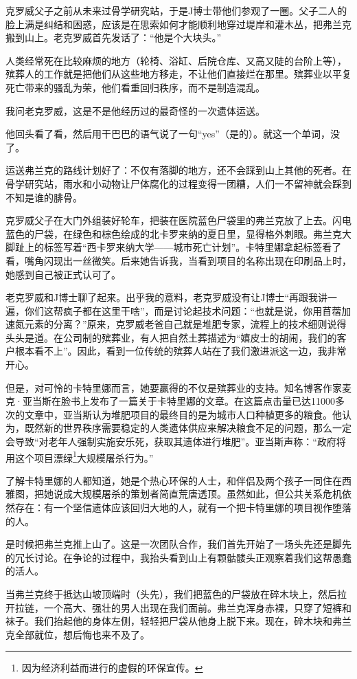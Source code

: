 \documentclass[12pt,oneside]{book}
\begin{document}
克罗威父子之前从未来过骨学研究站，于是J博士带他们参观了一圈。父子二人的脸上满是纠结和困惑，应该是在思索如何才能顺利地穿过堤岸和灌木丛，把弗兰克搬到山上。老克罗威首先发话了：“他是个大块头。”

人类经常死在比较麻烦的地方（轮椅、浴缸、后院仓库、又高又陡的台阶上等），殡葬人的工作就是把他们从这些地方移走，不让他们直接烂在那里。殡葬业以平复死亡带来的骚乱为荣，他们看重回归秩序，而不是制造混乱。

我问老克罗威，这是不是他经历过的最奇怪的一次遗体运送。

他回头看了看，然后用干巴巴的语气说了一句“yes”（是的）。就这一个单词，没了。

运送弗兰克的路线计划好了：不仅有落脚的地方，还不会踩到山上其他的死者。在骨学研究站，雨水和小动物让尸体腐化的过程变得一团糟，人们一不留神就会踩到不知是谁的腓骨。

克罗威父子在大门外组装好轮车，把装在医院蓝色尸袋里的弗兰克放了上去。闪电蓝色的尸袋，在绿色和棕色绘成的北卡罗来纳的夏日里，显得格外刺眼。弗兰克大脚趾上的标签写着“西卡罗来纳大学——城市死亡计划”。卡特里娜拿起标签看了看，嘴角闪现出一丝微笑。后来她告诉我，当看到项目的名称出现在印刷品上时，她感到自己被正式认可了。

老克罗威和J博士聊了起来。出乎我的意料，老克罗威没有让J博士“再跟我讲一遍，你们这帮疯子都在这里干啥”，而是讨论起技术问题：“也就是说，你用苜蓿加速氮元素的分离？”原来，克罗威老爸自己就是堆肥专家，流程上的技术细则说得头头是道。在公司制的殡葬业，有人把自然土葬描述为“嬉皮士的胡闹，我们的客户根本看不上”。因此，看到一位传统的殡葬人站在了我们激进派这一边，我非常开心。

但是，对可怜的卡特里娜而言，她要赢得的不仅是殡葬业的支持。知名博客作家麦克·亚当斯在脸书上发布了一篇关于卡特里娜的文章。在这篇点击量已达11000多次的文章中，亚当斯认为堆肥项目的最终目的是为城市人口种植更多的粮食。他认为，既然新的世界秩序需要稳定的人类遗体供应来解决粮食不足的问题，那么一定会导致“对老年人强制实施安乐死，获取其遗体进行堆肥”。亚当斯声称：“政府将用这个项目漂绿\footnote{因为经济利益而进行的虚假的环保宣传。}大规模屠杀行为。”

了解卡特里娜的人都知道，她是个热心环保的人士，和伴侣及两个孩子一同住在西雅图，把她说成大规模屠杀的策划者简直荒唐透顶。虽然如此，但公共关系危机依然存在：有一个坚信遗体应该回归大地的人，就有一个把卡特里娜的项目视作堕落的人。

是时候把弗兰克推上山了。这是一次团队合作，我们首先开始了一场头先还是脚先的冗长讨论。在争论的过程中，我抬头看到山上有颗骷髅头正观察着我们这帮愚蠢的活人。

当弗兰克终于抵达山坡顶端时（头先），我们把蓝色的尸袋放在碎木块上，然后拉开拉链，一个高大、强壮的男人出现在我们面前。弗兰克浑身赤裸，只穿了短裤和袜子。我们抬起他的身体左侧，轻轻把尸袋从他身上脱下来。现在，碎木块和弗兰克全部就位，想后悔也来不及了。
\end{document}
